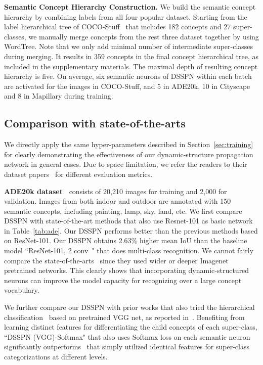 \documentclass[10pt,twocolumn,letterpaper]{article}
\begin{document}
\textbf{Semantic Concept Hierarchy Construction.} We build the semantic concept hierarchy by combining labels from all four popular dataset. Starting from the label hierarchical tree of COCO-Stuff~\cite{caesar2016coco} that includes 182 concepts and 27 super-classes, we manually  merge concepts from the rest three dataset together by using WordTree. Note that we only add minimal number of intermediate super-classes during merging. It results in 359 concepts in the final concept hierarchical tree, as included in the supplementary materials. The maximal depth of resulting concept hierarchy is five. On average, six semantic neurons of DSSPN within each batch are activated for the images in COCO-Stuff, and 5 in ADE20k, 10 in Cityscape and 8 in Mapillary during training.




\subsection{Comparison with state-of-the-arts}

We directly apply the same hyper-parameters described in Section~\ref{sec:training} for clearly demonstrating the effectiveness of our dynamic-structure propagation network in general cases. Due to space limitation, we refer the readers to their dataset papers~\cite{zhou2016semantic,caesar2016coco,cordts2015cityscapes,neuhold2017mapillary} for different evaluation metrics.

\textbf{ADE20k dataset~\cite{zhou2016semantic}} consists of 20,210 images for training and 2,000 for validation. Images from both indoor and outdoor are annotated with 150 semantic concepts, including painting, lamp, sky, land, etc.
We first compare DSSPN with state-of-the-art methods that also use Resnet-101 as basic network in Table~\ref{tab:ade}. Our DSSPN performs better than the previous methods based on ResNet-101. Our DSSPN obtains 2.63\% higher mean IoU than the baseline model ``ResNet-101, 2 conv~\cite{wu2016wider}" that does multi-class recognition. We cannot fairly compare the state-of-the-arts~\cite{wu2016wider,zhao2016pyramid} since they used wider or deeper Imagenet pretrained networks. This clearly shows that incorporating dynamic-structured neurons can improve the model capacity for recognizing over a large concept vocabulary.

We further compare our DSSPN with prior works that also tried the hierarchical classification~\cite{redmon2016yolo9000,frome2013devise,zhao2017open} based on pretrained VGG
net, as reported in~\cite{zhao2017open}. Benefiting from learning distinct features for differentiating the child concepts of each super-class, ``DSSPN (VGG)-Softmax" that also uses Softmax loss on each semantic neuron significantly outperforms~\cite{redmon2016yolo9000,frome2013devise,zhao2017open} that simply utilized identical features for super-class categorizations at different levels.  
\end{document}
